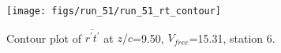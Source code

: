\begin{figure}[H]
\centering
\texttt{[image: figs/run\_51/run\_51\_rt\_contour]}
\caption{Contour plot of $\overline{r^\prime t^\prime}$ at $z/c$=9.50, $V_{free}$=15.31, station 6.}
\end{figure}


